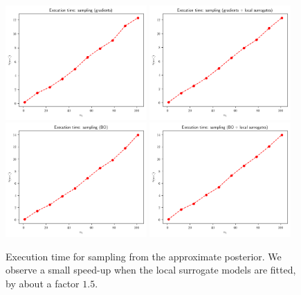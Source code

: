 \begin{figure}[ht]
    \begin{center}
      \includegraphics[width=0.48\textwidth]{./Thesis/images/chapter4/exec_sample_grad.png}
      \includegraphics[width=0.48\textwidth]{./Thesis/images/chapter4/exec_sample_grad_fit.png}\\
      \includegraphics[width=0.48\textwidth]{./Thesis/images/chapter4/exec_sample_bo.png}
      \includegraphics[width=0.48\textwidth]{./Thesis/images/chapter4/exec_sample_bo_fit.png}
    \end{center}
    \caption[Execution time for sampling from the approximate posterior.]{Execution time for sampling from the approximate
      posterior. We observe a small speed-up when the local surrogate
      models are fitted, by about a factor $1.5$.}
  \label{fig:exec_sample}
\end{figure}
